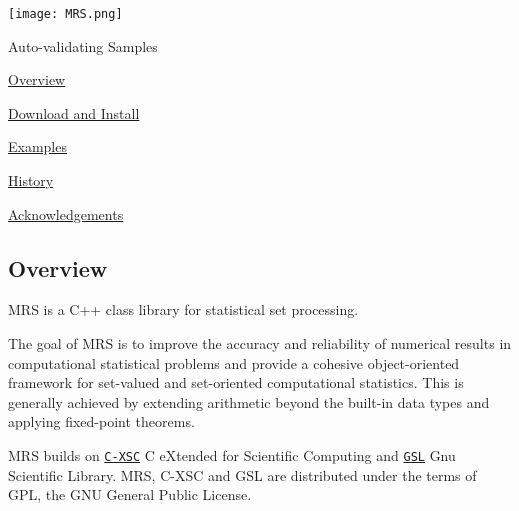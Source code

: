  
\begin{DoxyImage}
\texttt{[image: MRS.png]}
\caption{\-Auto-\/validating \-Samples}
\end{DoxyImage}



\begin{DoxyItemize}
\item \hyperlink{index_mainpage_sec_overview}{\-Overview}
\item \hyperlink{index_mainpage_sec_install}{\-Download and \-Install}
\item \hyperlink{index_mainpage_sec_examples}{\-Examples}
\item \hyperlink{index_mainpage_sec_history}{\-History}
\item \hyperlink{index_mainpage_sec_acknowledgements}{\-Acknowledgements}
\end{DoxyItemize}



\hypertarget{index_mainpage_sec_overview}{}\subsection{\-Overview}\label{index_mainpage_sec_overview}
\-M\-R\-S is a \-C++ class library for statistical set processing.

\-The goal of \-M\-R\-S is to improve the accuracy and reliability of numerical results in computational statistical problems and provide a cohesive object-\/oriented framework for set-\/valued and set-\/oriented computational statistics. \-This is generally achieved by extending arithmetic beyond the built-\/in data types and applying fixed-\/point theorems.

\-M\-R\-S builds on \href{http://www.math.uni-wuppertal.de/wrswt/xsc/cxsc_new.html}{\tt \-C-\/\-X\-S\-C} \-C e\-Xtended for \-Scientific \-Computing and \href{http://www.gnu.org/software/gsl/}{\tt \-G\-S\-L} \-Gnu \-Scientific \-Library. \-M\-R\-S, \-C-\/\-X\-S\-C and \-G\-S\-L are distributed under the terms of \-G\-P\-L, the \-G\-N\-U \-General \-Public \-License.




